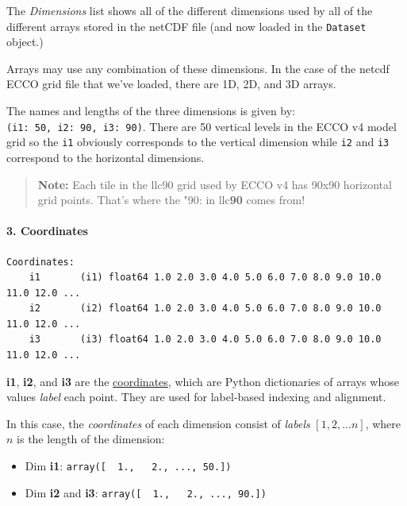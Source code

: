 \documentclass[11pt]{article}
\providecommand{\tightlist}{%
      \setlength{\itemsep}{0pt}\setlength{\parskip}{0pt}}
\begin{document}
The \emph{Dimensions} list shows all of the different dimensions used by
all of the different arrays stored in the netCDF file (and now loaded in
the \texttt{Dataset} object.)

Arrays may use any combination of these dimensions. In the case of the
netcdf ECCO grid file that we've loaded, there are 1D, 2D, and 3D
arrays.

The names and lengths of the three dimensions is given by:
\texttt{(i1:\ 50,\ i2:\ 90,\ i3:\ 90)}. There are 50 vertical levels in
the ECCO v4 model grid so the \texttt{i1} obviously corresponds to the
vertical dimension while \texttt{i2}\textbar{} and \texttt{i3}
correspond to the horizontal dimensions.

\begin{quote}
\textbf{Note:} Each tile in the llc90 grid used by ECCO v4 has 90x90
horizontal grid points. That's where the "90: in llc\textbf{90} comes
from!
\end{quote}

\paragraph{3. Coordinates}\label{coordinates}

\begin{verbatim}
Coordinates:
    i1       (i1) float64 1.0 2.0 3.0 4.0 5.0 6.0 7.0 8.0 9.0 10.0 11.0 12.0 ...
    i2       (i2) float64 1.0 2.0 3.0 4.0 5.0 6.0 7.0 8.0 9.0 10.0 11.0 12.0 ...
    i3       (i3) float64 1.0 2.0 3.0 4.0 5.0 6.0 7.0 8.0 9.0 10.0 11.0 12.0 ... 
\end{verbatim}

\textbf{i1}, \textbf{i2}, and \textbf{i3} are the
\href{http://xarray.pydata.org/en/stable/data-structures.html\#coordinates}{coordinates},
which are Python dictionaries of arrays whose values \emph{label} each
point. They are used for label-based indexing and alignment.

In this case, the \emph{coordinates} of each dimension consist of
\emph{labels} \([1, 2, ... n]\), where \(n\) is the length of the
dimension:

\begin{itemize}
\tightlist
\item
  Dim \textbf{i1}: \texttt{array({[}\ \ 1.,\ \ \ 2.,\ ...,\ 50.{]})}
\item
  Dim \textbf{i2} and \textbf{i3}:
  \texttt{array({[}\ \ 1.,\ \ \ 2.,\ ...,\ 90.{]})}
\end{itemize}
\end{document}
